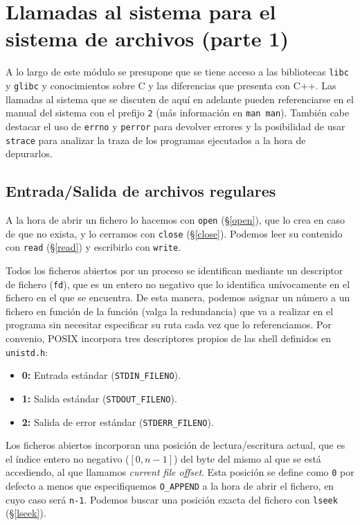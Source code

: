 \section{Llamadas al sistema para el sistema de archivos (parte 1)}

A lo largo de este módulo se presupone que se tiene acceso a las bibliotecas \texttt{libc} y \texttt{glibc} y conocimientos sobre C y las diferencias que presenta con C++.
Las llamadas al sistema que se discuten de aquí en adelante pueden referenciarse en el manual del sistema con el prefijo \texttt{2} (más información en \texttt{man man}).
También cabe destacar el uso de \texttt{errno} y \texttt{perror} para devolver errores y la posibilidad de usar \texttt{strace} para analizar la traza de los programas ejecutados a la hora de depurarlos.

\subsection{Entrada/Salida de archivos regulares}

A la hora de abrir un fichero lo hacemos con \texttt{open} (\S\ref{open}), que lo crea en caso de que no exista, y lo cerramos con \texttt{close} (\S\ref{close}).
Podemos leer su contenido con \texttt{read} (\S\ref{read}) y escribirlo con \texttt{write}.

Todos los ficheros abiertos por un proceso se identifican mediante un descriptor de fichero (\texttt{fd}), que es un entero no negativo que lo identifica unívocamente en el fichero en el que se encuentra.
De esta manera, podemos asignar un número a un fichero en función de la función (valga la redundancia) que va a realizar en el programa sin necesitar especificar su ruta cada vez que lo referenciamos.
Por convenio, POSIX incorpora tres descriptores propios de las shell definidos en \texttt{unistd.h}:

\begin{itemize}
	\item\textbf{0:} Entrada estándar (\texttt{STDIN\_FILENO}).
	\item\textbf{1:} Salida estándar (\texttt{STDOUT\_FILENO}).
	\item\textbf{2:} Salida de error estándar (\texttt{STDERR\_FILENO}).
\end{itemize}

Los ficheros abiertos incorporan una posición de lectura/escritura actual, que es el índice entero no negativo ($[0,n-1]$) del byte del mismo al que se está accediendo, al que llamamos \emph{current file offset}.
Esta posición se define como \texttt{0} por defecto a menos que especifiquemos \texttt{O\_APPEND} a la hora de abrir el fichero, en cuyo caso será \texttt{n-1}.
Podemos buscar una posición exacta del fichero con \texttt{lseek} (\S\ref{lseek}).

